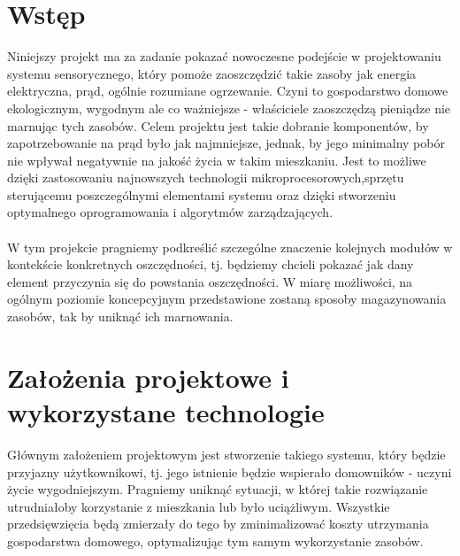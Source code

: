 \documentclass[12pt]{article} %
\begin{document}
\newpage %


\section{Wstęp} 

Niniejszy projekt ma za zadanie pokazać nowoczesne podejście w projektowaniu systemu sensorycznego, który pomoże zaoszczędzić takie zasoby jak energia elektryczna, prąd, ogólnie rozumiane ogrzewanie. Czyni to gospodarstwo domowe ekologicznym, wygodnym ale co ważniejsze - właściciele zaoszczędzą pieniądze nie marnując tych zasobów. Celem projektu jest takie dobranie komponentów, by zapotrzebowanie na prąd było jak najmniejsze, jednak, by jego minimalny pobór nie wpływał negatywnie na jakość życia w takim mieszkaniu. Jest to możliwe dzięki zastosowaniu najnowszych technologii mikroprocesorowych,sprzętu sterującemu poszczególnymi elementami systemu oraz dzięki stworzeniu optymalnego oprogramowania i algorytmów zarządzających.
\\ \\
W tym projekcie pragniemy podkreślić szczególne znaczenie kolejnych modułów w kontekście konkretnych oszczędności, tj. będziemy chcieli pokazać jak dany element przyczynia się do powstania oszczędności. W miarę możliwości, na ogólnym poziomie koncepcyjnym przedstawione zostaną sposoby magazynowania zasobów, tak by uniknąć ich marnowania. 

\section{Założenia projektowe i wykorzystane technologie}
Głównym założeniem projektowym jest stworzenie takiego systemu, który będzie przyjazny użytkownikowi, tj. jego istnienie będzie wspierało domowników - uczyni życie wygodniejszym. Pragniemy uniknąć sytuacji, w której takie rozwiązanie utrudniałoby korzystanie z mieszkania lub było uciążliwym. Wszystkie przedsięwzięcia będą zmierzały do tego by zminimalizować koszty utrzymania gospodarstwa domowego, optymalizując tym samym wykorzystanie zasobów.
\end{document}
